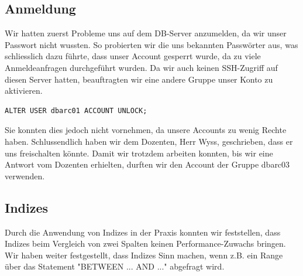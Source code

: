 \documentclass[10pt]{article}
\begin{document}
\subsection{Anmeldung}
Wir hatten zuerst Probleme uns auf dem DB-Server anzumelden, da wir unser Passwort nicht wussten. So 
probierten wir die uns bekannten Passwörter aus, was schliesslich dazu führte, dass unser Account
gesperrt wurde, da zu viele Anmeldeanfragen durchgeführt wurden. Da wir auch keinen SSH-Zugriff auf diesen 
Server hatten, beauftragten wir eine andere Gruppe unser Konto zu aktivieren.
\begin{lstlisting}[style=sql]
ALTER USER dbarc01 ACCOUNT UNLOCK;
\end{lstlisting}
Sie konnten dies jedoch nicht vornehmen, da unsere Accounts zu wenig Rechte haben. Schlussendlich 
haben wir dem Dozenten, Herr Wyss, geschrieben, dass er uns freischalten könnte. Damit wir trotzdem 
arbeiten konnten, bis wir eine Antwort vom Dozenten erhielten, durften wir den Account der Gruppe dbarc03 
verwenden.

\subsection{Indizes}
Durch die Anwendung von Indizes in der Praxis konnten wir feststellen, dass Indizes beim Vergleich von zwei Spalten keinen
Performance-Zuwachs bringen. Wir haben weiter festgestellt, dass Indizes Sinn machen, wenn z.B. ein Range über das Statement "BETWEEN ... AND ..." abgefragt wird.

\end{document}
